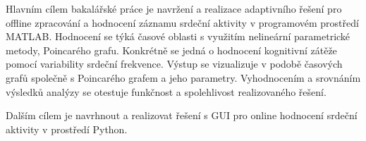 Hlavním cílem bakalářské práce je navržení a realizace adaptivního řešení pro
offline zpracování a hodnocení záznamu srdeční aktivity v programovém prostředí
MATLAB. Hodnocení se týká časové oblasti s využitím nelineární parametrické
metody, Poincarého grafu. Konkrétně se jedná o hodnocení kognitivní zátěže
pomocí variability srdeční frekvence. Výstup se vizualizuje v podobě časových
grafů společně s Poincarého grafem a jeho parametry. Vyhodnocením a srovnáním
výsledků analýzy se otestuje funkčnost a spolehlivost realizovaného řešení.

Dalším cílem je navrhnout a realizovat řešení s GUI pro online hodnocení srdeční
aktivity v prostředí Python. 

